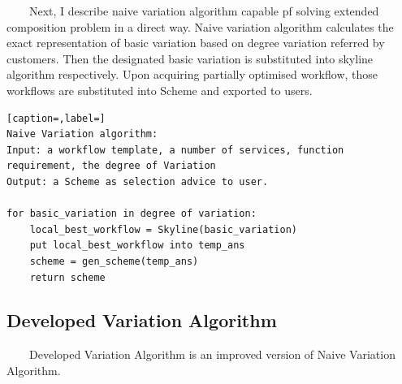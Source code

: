 \documentclass[senior,final,11pt]{iscs-thesis}
\begin{document}
 
~~~~Next, I describe naive variation algorithm capable pf solving extended composition problem in a direct way. Naive variation algorithm calculates the exact representation of basic variation based on degree variation referred by customers. Then the designated basic variation is substituted into skyline algorithm respectively. Upon acquiring partially optimised workflow, those workflows are substituted into Scheme and exported to users. 
 
 \begin{lstlisting}[caption=,label=]
Naive Variation algorithm:
Input: a workflow template, a number of services, function requirement, the degree of Variation
Output: a Scheme as selection advice to user.

for basic_variation in degree of variation:
	local_best_workflow = Skyline(basic_variation)
	put local_best_workflow into temp_ans
	scheme = gen_scheme(temp_ans)
	return scheme
\end{lstlisting}

\subsection{Developed Variation Algorithm}%

~~~~Developed Variation Algorithm is an improved version of Naive Variation Algorithm. 


\end{document}
